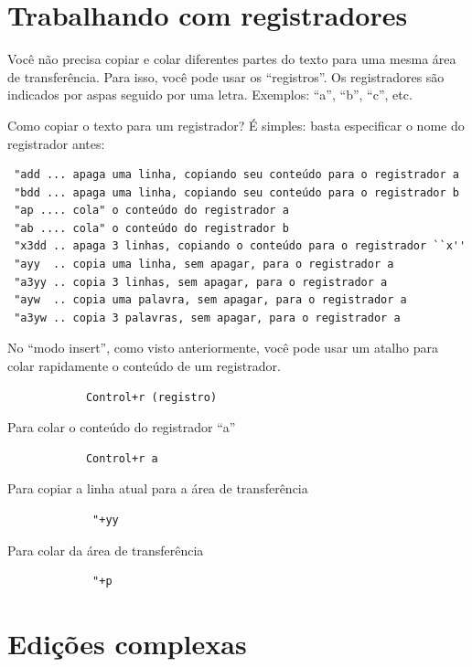 \documentclass[10pt,a4paper,openany]{book}
\begin{document}
\section{Trabalhando com registradores}
\label{Trabalhando com registradores}

Você não precisa copiar e colar diferentes partes do texto para uma
mesma área de transferência.  Para isso, você pode usar os
``registros''.  Os registradores são indicados por aspas seguido por uma letra.
Exemplos: ``a'', ``b'', ``c'', etc.

Como copiar o texto para um registrador? É simples: basta especificar
o nome do registrador antes:

\begin{verbatim}
 "add ... apaga uma linha, copiando seu conteúdo para o registrador a
 "bdd ... apaga uma linha, copiando seu conteúdo para o registrador b
 "ap .... cola" o conteúdo do registrador a
 "ab .... cola" o conteúdo do registrador b
 "x3dd .. apaga 3 linhas, copiando o conteúdo para o registrador ``x''
 "ayy  .. copia uma linha, sem apagar, para o registrador a
 "a3yy .. copia 3 linhas, sem apagar, para o registrador a
 "ayw  .. copia uma palavra, sem apagar, para o registrador a
 "a3yw .. copia 3 palavras, sem apagar, para o registrador a
\end{verbatim}

No ``modo insert'', como visto anteriormente, você pode usar um atalho
para colar rapidamente o conteúdo de um registrador.

\begin{verbatim}
			Control+r (registro)
\end{verbatim}

Para colar o conteúdo do registrador ``a''

\begin{verbatim}
			Control+r a
\end{verbatim}

Para copiar a linha atual para a área de transferência

\begin{verbatim}
			 "+yy
\end{verbatim}

Para colar da área de transferência

\begin{verbatim}
			 "+p
\end{verbatim}

\section{Edições complexas }
\label{Edições complexas }
\end{document}
